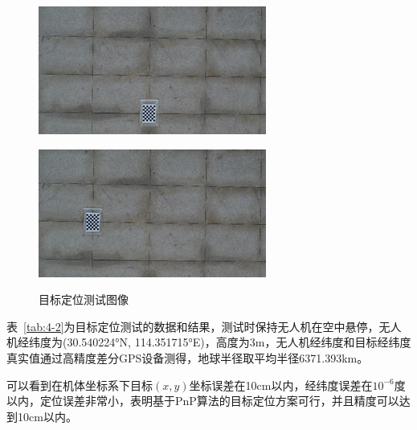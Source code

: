 \begin{figure}[htb]
\begin{minipage}[t]{0.5\linewidth}
		\label{fig:4-5b} 
	\end{minipage}
	\begin{minipage}[t]{0.5\linewidth} 
		\centering
		\includegraphics[width=\columnwidth]{figures/4-5c.png} 
		\label{fig:4-5c} 
	\end{minipage}
	\begin{minipage}[t]{0.5\linewidth} 
		\centering
		\includegraphics[width=\columnwidth]{figures/4-5d.png} 
		\label{fig:4-5d} 
	\end{minipage}
	\caption{目标定位测试图像}
	\label{fig:4-5}
\end{figure}

表~\ref{tab:4-2}为目标定位测试的数据和结果，测试时保持无人机在空中悬停，无人机经纬度为(30.540224°N, 114.351715°E)，高度为3m，无人机经纬度和目标经纬度真实值通过高精度差分GPS设备测得，地球半径取平均半径6371.393km。

可以看到在机体坐标系下目标$(x, y)$坐标误差在10cm以内，经纬度误差在$10^{-6}$度以内，定位误差非常小，表明基于PnP算法的目标定位方案可行，并且精度可以达到10cm以内。

